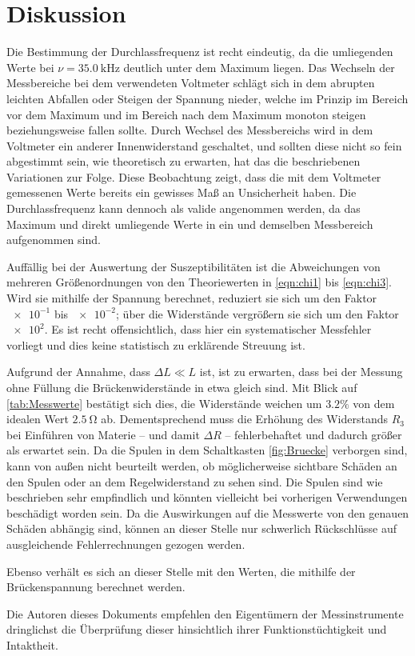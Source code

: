 \section{Diskussion}
\label{sec:Diskussion}

Die Bestimmung der Durchlassfrequenz ist recht eindeutig, da die umliegenden Werte bei $\nu=\SI{35.0}{\kilo\hertz}$ 
deutlich unter dem Maximum liegen. 
Das Wechseln der Messbereiche bei dem verwendeten Voltmeter schlägt sich in dem abrupten leichten Abfallen oder Steigen 
der Spannung nieder, welche im Prinzip im Bereich vor dem Maximum und im Bereich nach dem Maximum monoton steigen beziehungsweise 
fallen sollte. 
Durch Wechsel des Messbereichs wird in dem Voltmeter ein anderer Innenwiderstand geschaltet, und sollten diese nicht 
so fein abgestimmt sein, wie theoretisch zu erwarten, hat das die beschriebenen Variationen zur Folge. 
Diese Beobachtung zeigt, dass die mit dem Voltmeter gemessenen Werte bereits ein gewisses Maß an Unsicherheit haben. 
Die Durchlassfrequenz kann dennoch als valide angenommen werden, da das Maximum und direkt umliegende Werte 
in ein und demselben Messbereich aufgenommen sind. 

Auffällig bei der Auswertung der Suszeptibilitäten ist die Abweichungen von mehreren Größenordnungen von den Theoriewerten in \eqref{eqn:chi1} bis \eqref{eqn:chi3}. 
Wird sie mithilfe der Spannung berechnet, reduziert sie sich um den Faktor $\num{e-1}$ bis $\num{e-2}$; 
über die Widerstände vergrößern sie sich um den Faktor $\num{e2}$. 
Es ist recht offensichtlich, dass hier ein systematischer Messfehler vorliegt und dies keine statistisch zu erklärende Streuung ist.

Aufgrund der Annahme, dass $\Delta L\ll L$ ist, ist zu erwarten, dass bei der Messung ohne Füllung die Brückenwiderstände 
in etwa gleich sind. Mit Blick auf \ref{tab:Messwerte} bestätigt sich dies, die Widerstände weichen um $3.2\%$ von dem 
idealen Wert $\SI{2.5}{\ohm}$ ab. 
Dementsprechend muss die Erhöhung des Widerstands $R_3$ bei Einführen von Materie -- und damit $\Delta R$ -- fehlerbehaftet und dadurch größer als erwartet sein. 
Da die Spulen in dem Schaltkasten \ref{fig:Bruecke} verborgen sind, kann von außen nicht beurteilt werden, ob möglicherweise 
sichtbare Schäden an den Spulen oder an dem Regelwiderstand zu sehen sind. 
Die Spulen sind wie beschrieben sehr empfindlich und könnten vielleicht bei vorherigen Verwendungen beschädigt worden sein. 
Da die Auswirkungen auf die Messwerte von den genauen Schäden abhängig sind, können an dieser Stelle nur schwerlich Rückschlüsse 
auf ausgleichende Fehlerrechnungen gezogen werden. 

Ebenso verhält es sich an dieser Stelle mit den Werten, die mithilfe der Brückenspannung berechnet werden. 

Die Autoren dieses Dokuments empfehlen den Eigentümern der Messinstrumente dringlichst die Überprüfung dieser hinsichtlich 
ihrer Funktionstüchtigkeit und Intaktheit. 